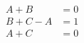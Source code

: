 \documentclass[preview]{standalone}
\begin{document}
\begin{align*}
A+B &= 0 \\ B+C-A &= 1 \\ A+C &= 0
\end{align*}
\end{document}
